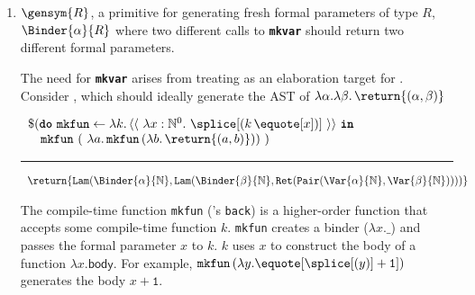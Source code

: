 \begin{enumerate}

\item $\gensym{R}$, a primitive for generating fresh formal parameters of type $R$, $\Binder{\alpha}{R}$ where two different calls to \textbf{\texttt{mkvar}} should return two different formal parameters.

The need for \textbf{\texttt{mkvar}} arises from treating \coreLang{} as an elaboration target for \sourceLang{}. Consider , which should ideally generate the AST of $\lambda \alpha. \lambda \beta. \, \return{(\alpha, \beta)}$

\begin{code}
\begin{sourcelst}
$\begin{array}{l}
\$(\textbf{\texttt{do}} \, \, \texttt{mkfun} \leftarrow {\lambda k. \, {\langle\langle\,\, \lambda x: \mathbb{N}^0. \,\, \splice[(k \, {\equote[x]})]\,\, \rangle\rangle}} \, \, \textbf{\texttt{in}} \\
\quad \texttt{mkfun} \,\, (\,\, \lambda a. \, \texttt{mkfun} \, (\lambda b. \, \return{(a, b)})) \,\, )
\end{array}$

\vspace{2mm} 
\textcolor{sourceComment}{\hrule height 0.2mm \relax}
\vspace{2mm} 

\textcolor{sourceComment}{$\begin{array}{l}\return{\texttt{Lam}(\Binder{\alpha}{\mathbb{N}}, \texttt{Lam}(\Binder{\beta}{\mathbb{N}}, \texttt{Ret}(\texttt{Pair}(\Var{\alpha}{\mathbb{N}}, \Var{\beta}{\mathbb{N}}))))}\end{array}$}
\end{sourcelst}
%
\label{listing:source-gensym}
\end{code}

The compile-time function \texttt{mkfun} (\citeauthor{taha-1999}'s \citep{taha-1999} \texttt{back}) is a higher-order function that accepts some compile-time function $k$. \texttt{mkfun} creates a binder ($\lambda x. \_$) and passes the formal parameter $x$ to $k$. $k$ uses $x$ to construct the \textsf{body} of a function $\lambda x. \textsf{body}$. For example, $\texttt{mkfun} \,  (\lambda y. \equote[{\splice[(y)]} + \texttt{1}])$ generates the body $x + \texttt{1}$.


\end{enumerate}
